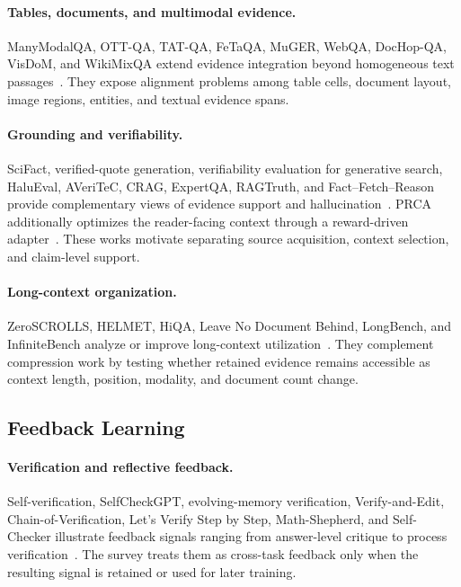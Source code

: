 \paragraph{Tables, documents, and multimodal evidence.}
ManyModalQA, OTT-QA, TAT-QA, FeTaQA, MuGER, WebQA, DocHop-QA, VisDoM, and WikiMixQA extend evidence integration beyond homogeneous text passages~\cite{extEO007,extEO014,extEO017,extEO020,extEO023,extEO025,extEO067,extEO073,extEO074}. They expose alignment problems among table cells, document layout, image regions, entities, and textual evidence spans.

\paragraph{Grounding and verifiability.}
SciFact, verified-quote generation, verifiability evaluation for generative search, HaluEval, AVeriTeC, CRAG, ExpertQA, RAGTruth, and Fact--Fetch--Reason provide complementary views of evidence support and hallucination~\cite{extEO004,extEO024,extEO030,extEO033,extEO046,extEO047,extEO048,extEO058,extEO068}. PRCA additionally optimizes the reader-facing context through a reward-driven adapter~\cite{extEO036}. These works motivate separating source acquisition, context selection, and claim-level support.

\paragraph{Long-context organization.}
ZeroSCROLLS, HELMET, HiQA, Leave No Document Behind, LongBench, and InfiniteBench analyze or improve long-context utilization~\cite{extEO041,extEO052,extEO053,extEO054,extEO056,extEO064}. They complement compression work by testing whether retained evidence remains accessible as context length, position, modality, and document count change.

\subsection{Feedback Learning}
\paragraph{Verification and reflective feedback.}
Self-verification, SelfCheckGPT, evolving-memory verification, Verify-and-Edit, Chain-of-Verification, Let's Verify Step by Step, Math-Shepherd, and Self-Checker illustrate feedback signals ranging from answer-level critique to process verification~\cite{extFL006,extFL013,extFL015,extFL016,extFL019,extFL021,extFL022,extFL023}. The survey treats them as cross-task feedback only when the resulting signal is retained or used for later training.

